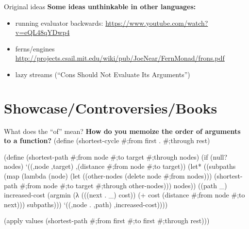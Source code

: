 \documentclass{beamer}
\newenvironment{Snippet}{\Verbatim[samepage=true,fontsize=\tiny]}{\endVerbatim}
\begin{document}
\begin{frame}{Original ideas}
  \textbf{Some ideas unthinkable in other languages:}
  \begin{itemize}
    \pause
  \item running evaluator backwards: \url{https://www.youtube.com/watch?v=eQL48qYDwp4}
    \pause
  \item ferns/engines \url{http://projects.csail.mit.edu/wiki/pub/JoeNear/FernMonad/frons.pdf}
    \pause
  \item lazy streams (``Cons Should Not Evaluate Its Arguments'')
  \end{itemize}
\end{frame}

\section{Showcase/Controversies/Books}
\begin{frame}[fragile]{What does the ``of'' mean?}
  \textbf{How do you memoize the order of arguments to a function?}
  \pause
  \begin{Snippet}
(define (shortest-cycle #;from first . #;through rest)

  (define (shortest-path #;from node #;to target #;through nodes)
    (if (null? nodes)
      `((,node ,target) ,(distance #;from node #;to target))
       (let* ((subpaths (map (lambda (node)
                               (let ((other-nodes (delete node #;from nodes)))
                                 (shortest-path #;from node #;to target
                                              #;through other-nodes)))
                             nodes))
              ((path _) increased-cost
                        (argmin (λ (((next . _) cost))
                                  (+ cost (distance #;from node #;to next)))
                                subpaths)))
         `((,node . ,path) ,increased-cost))))

  (apply values (shortest-path #;from first #;to first #;through rest)))
  \end{Snippet}
\end{frame}
\end{document}
